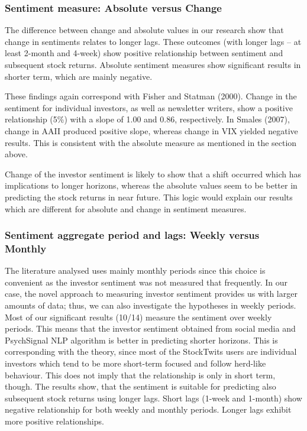 \subsubsection{Sentiment measure: Absolute versus Change}
The difference between change and absolute values in our research show that change in sentiments relates to longer lags. These outcomes (with longer lags – at least 2-month and 4-week) show positive relationship between sentiment and subsequent stock returns. Absolute sentiment measures show significant results in shorter term, which are mainly negative. 
\par
These findings again correspond with Fisher and Statman (2000). Change in the sentiment for individual investors, as well as newsletter writers, show a positive relationship (5\%) with a slope of 1.00 and 0.86, respectively. In Smales (2007), change in AAII produced positive slope, whereas change in VIX yielded negative results. This is consistent with the absolute measure as mentioned in the section above.
\par
Change of the investor sentiment is likely to show that a shift occurred which has implications to longer horizons, whereas the absolute values seem to be better in predicting the stock returns in near future. This logic would explain our results which are different for absolute and change in sentiment measures.

\subsubsection{Sentiment aggregate period and lags: Weekly versus Monthly}
The literature analysed uses mainly monthly periods since this choice is convenient as the investor sentiment was not measured that frequently. In our case, the novel approach to measuring investor sentiment provides us with larger amounts of data; thus, we can also investigate the hypotheses in weekly periods. Most of our significant results (10/14) measure the sentiment over weekly periods. This means that the investor sentiment obtained from social media and PsychSignal NLP algorithm is better in predicting shorter horizons. This is corresponding with the theory, since most of the StockTwits users are individual investors which tend to be more short-term focused and follow herd-like behaviour. This does not imply that the relationship is only in short term, though. The results show, that the sentiment is suitable for predicting also subsequent stock returns using longer lags. Short lags (1-week and 1-month) show negative relationship for both weekly and monthly periods. Longer lags exhibit more positive relationships. 

